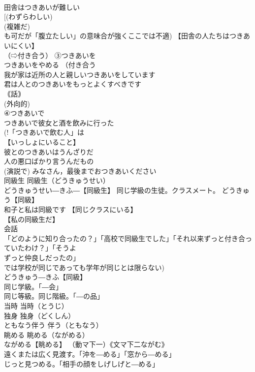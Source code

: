 \documentclass[8pt]{extreport}
\begin{document}
\begin{CJK}{UTF8}{min}
\\	田舎はつきあいが難しい 
\\	[(わずらわしい) 
\\	(複雑だ) 
\\	も可だが「腹立たしい」の意味合が強くここでは不適) 【田舎の人たちはつきあいにくい】
\\	（⇨付き合う） ③つきあいを 
\\	つきあいをやめる （付き合う
\\	我が家は近所の人と親しいつきあいをしています 
\\	君は人とのつきあいをもっとよくすべきです 
\\	｟話｠ 
\\	(外向的) 
\\	④つきあいで 
\\	つきあいで彼女と酒を飲みに行った 
\\	(!「つきあいで飲む人」は 
\\	【いっしょにいること】 
\\	彼とのつきあいはうんざりだ
\\	人の悪口ばかり言うんだもの 
\\	(演説で) みなさん，最後までおつきあいください 
\\	同級生		同級生（どうきゅうせい） 
\\	どうきゅうせい―きふ―【同級生】 同じ学級の生徒。クラスメート。 どうきゅう【同級】 
\\	和子と私は同級です 【同じクラスにいる】
\\	【私の同級生だ】
\\	会話 
\\	「どのように知り合ったの？」「高校で同級生でした」「それ以来ずっと付き合っていたわけ？」「そうよ
\\	ずっと仲良しだったの」 
\\	では学校が同じであっても学年が同じとは限らない) 
\\	どうきゅう―きふ【同級】 
\\	同じ学級。「―会」 
\\	同じ等級。同じ階級。「―の品」
\\	当時		当時（とうじ） 
\\	独身		独身（どくしん） 
\\	ともなう伴う		伴う（ともなう） 
\\	眺める		眺める（ながめる） 
\\	ながめる【眺める】 （動マ下一）《文マ下二ながむ》 
\\	遠くまたは広く見渡す。「沖を―める」「窓から―める」 
\\	じっと見つめる。「相手の顔をしげしげと―める」 

\end{CJK}
\end{document}
